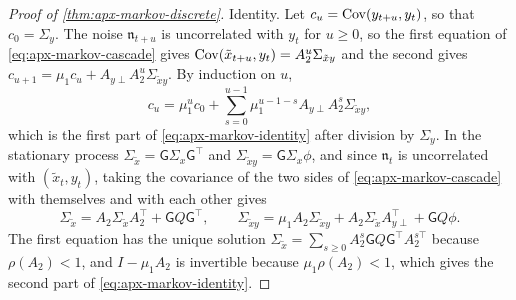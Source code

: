 \begin{proof}[Proof of \cref{thm:apx-markov-discrete}]
Identity. Let $c_u=\operatorname{Cov}(y_{t+u},y_t)$, so that $c_0=\Sigma_y$. The noise $\mathfrak n_{t+u}$ is uncorrelated with $y_t$ for $u\ge0$, so the first equation of \eqref{eq:apx-markov-cascade} gives $\operatorname{Cov}(\tilde x_{t+u},y_t)=A_2^u\Sigma_{\tilde xy}$ and the second gives $c_{u+1}=\mu_1c_u+A_{y\perp}A_2^u\Sigma_{\tilde xy}$. By induction on $u$,
\begin{equation*}
c_u=\mu_1^uc_0+\sum_{s=0}^{u-1}\mu_1^{u-1-s}A_{y\perp}A_2^s\Sigma_{\tilde xy},
\end{equation*}
which is the first part of \eqref{eq:apx-markov-identity} after division by $\Sigma_y$. In the stationary process $\Sigma_{\tilde x}=\mathsf G\Sigma_x\mathsf G^\top$ and $\Sigma_{\tilde xy}=\mathsf G\Sigma_x\phi$, and since $\mathfrak n_t$ is uncorrelated with $(\tilde x_t,y_t)$, taking the covariance of the two sides of \eqref{eq:apx-markov-cascade} with themselves and with each other gives
\begin{equation*}
\Sigma_{\tilde x}=A_2\Sigma_{\tilde x}A_2^\top+\mathsf GQ\mathsf G^\top,\qquad\Sigma_{\tilde xy}=\mu_1A_2\Sigma_{\tilde xy}+A_2\Sigma_{\tilde x}A_{y\perp}^\top+\mathsf GQ\phi .
\end{equation*}
The first equation has the unique solution $\Sigma_{\tilde x}=\sum_{s\ge0}A_2^s\mathsf GQ\mathsf G^\top A_2^{s\top}$ because $\rho(A_2)<1$, and $I-\mu_1A_2$ is invertible because $\mu_1\rho(A_2)<1$, which gives the second part of \eqref{eq:apx-markov-identity}.


\end{proof}
